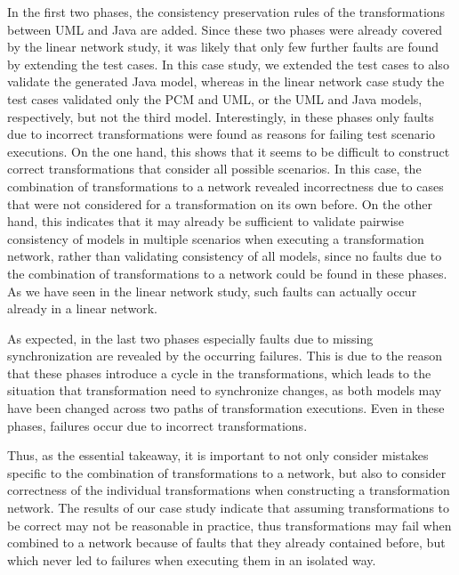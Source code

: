 In the first two phases, the consistency preservation rules of the transformations between \gls{UML} and Java are added.
Since these two phases were already covered by the linear network study, it was likely that only few further faults are found by extending the test cases.
In this case study, we extended the test cases to also validate the generated Java model, whereas in the linear network case study the test cases validated only the \gls{PCM} and \gls{UML}, or the \gls{UML} and Java models, respectively, but not the third model.
Interestingly, in these phases only faults due to incorrect transformations were found as reasons for failing test scenario executions.
On the one hand, this shows that it seems to be difficult to construct correct transformations that consider all possible scenarios.
In this case, the combination of transformations to a network revealed incorrectness due to cases that were not considered for a transformation on its own before.
On the other hand, this indicates that it may already be sufficient to validate pairwise consistency of models in multiple scenarios when executing a transformation network, rather than validating consistency of all models, since no faults due to the combination of transformations to a network could be found in these phases.
As we have seen in the linear network study, such faults can actually occur already in a linear network.

As expected, in the last two phases especially faults due to missing synchronization are revealed by the occurring failures.
This is due to the reason that these phases introduce a cycle in the transformations, which leads to the situation that transformation need to synchronize changes, as both models may have been changed across two paths of transformation executions.
Even in these phases, failures occur due to incorrect transformations.

Thus, as the essential takeaway, it is important to not only consider mistakes specific to the combination of transformations to a network, but also to consider correctness of the individual transformations when constructing a transformation network.
The results of our case study indicate that assuming transformations to be correct may not be reasonable in practice, thus transformations may fail when combined to a network because of faults that they already contained before, but which never led to failures when executing them in an isolated way.


